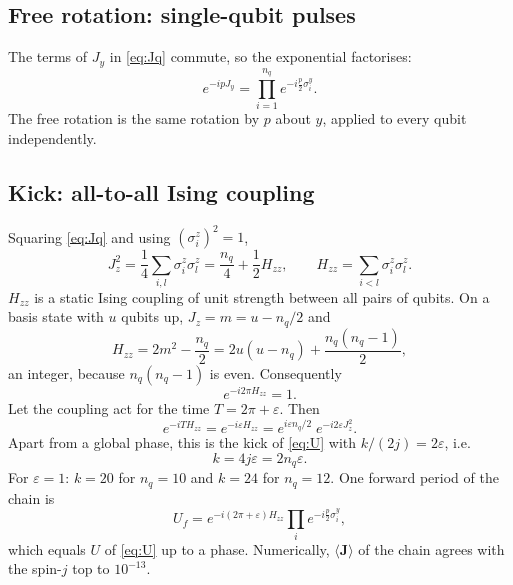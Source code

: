 \documentclass[11pt,a4paper]{article}
\begin{document}
\subsection{Free rotation: single-qubit pulses}

The terms of $J_y$ in \cref{eq:Jq} commute, so the exponential factorises:
\begin{equation}
  e^{-ipJ_y} = \prod_{i=1}^{n_q} e^{-i\frac p2\sigma^y_i}.
\end{equation}
The free rotation is the same rotation by $p$ about $y$, applied to every qubit independently.

\subsection{Kick: all-to-all Ising coupling}

Squaring \cref{eq:Jq} and using $(\sigma^z_i)^2=1$,
\begin{equation}
  J_z^2 = \frac14\sum_{i,l}\sigma^z_i\sigma^z_l = \frac{n_q}{4} + \frac12 H_{zz},\qquad
  H_{zz} = \sum_{i<l}\sigma^z_i\sigma^z_l .
\end{equation}
$H_{zz}$ is a static Ising coupling of unit strength between all pairs of qubits. On a basis state with $u$ qubits up,
$J_z = m = u-n_q/2$ and
\begin{equation}\label{eq:Hzz}
  H_{zz} = 2m^2-\frac{n_q}{2} = 2u(u-n_q)+\frac{n_q(n_q-1)}{2},
\end{equation}
an integer, because $n_q(n_q-1)$ is even. Consequently
\begin{equation}
  e^{-i2\pi H_{zz}} = 1 .
\end{equation}
Let the coupling act for the time $T=2\pi+\varepsilon$. Then
\begin{equation}\label{eq:kickq}
  e^{-iTH_{zz}} = e^{-i\varepsilon H_{zz}} = e^{i\varepsilon n_q/2}\;e^{-i2\varepsilon J_z^2}.
\end{equation}
Apart from a global phase, this is the kick of \cref{eq:U} with $k/(2j)=2\varepsilon$, i.e.
\begin{equation}\label{eq:k}
  k = 4j\varepsilon = 2n_q\varepsilon .
\end{equation}
For $\varepsilon=1$: $k=20$ for $n_q=10$ and $k=24$ for $n_q=12$. One forward period of the chain is
\begin{equation}\label{eq:Uf}
  U_f = e^{-i(2\pi+\varepsilon)H_{zz}}\prod_{i}e^{-i\frac p2\sigma^y_i} ,
\end{equation}
which equals $U$ of \cref{eq:U} up to a phase. Numerically, $\langle\bm J\rangle$ of the chain agrees with the
spin-$j$ top to $10^{-13}$.
\end{document}
